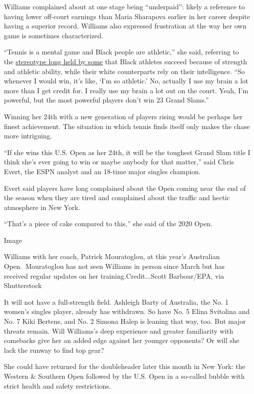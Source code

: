 Williams complained about at one stage being ``underpaid'': likely a
reference to having lower off-court earnings than Maria Sharapova
earlier in her career despite having a superior record. Williams also
expressed frustration at the way her own game is sometimes
characterized.

``Tennis is a mental game and Black people are athletic,'' she said,
referring to the
\href{https://www.nytimes.com/2020/06/30/sports/soccer/soccer-racism-broadcasting.html}{stereotype
long held by some} that Black athletes succeed because of strength and
athletic ability, while their white counterparts rely on their
intelligence. ``So whenever I would win, it's like, `I'm so athletic.'
No, actually I use my brain a lot more than I get credit for. I really
use my brain a lot out on the court. Yeah, I'm powerful, but the most
powerful players don't win 23 Grand Slams.''

Winning her 24th with a new generation of players rising would be
perhaps her finest achievement. The situation in which tennis finds
itself only makes the chase more intriguing.

``If she wins this U.S. Open as her 24th, it will be the toughest Grand
Slam title I think she's ever going to win or maybe anybody for that
matter,'' said Chris Evert, the ESPN analyst and an 18-time major
singles champion.

Evert said players have long complained about the Open coming near the
end of the season when they are tired and complained about the traffic
and hectic atmosphere in New York.

``That's a piece of cake compared to this,'' she said of the 2020 Open.

Image

Williams with her coach, Patrick Mouratoglou, at this year's Australian
Open.~Mouratoglou has not seen Williams in person since March but has
received regular updates on her training.Credit...Scott Barbour/EPA, via
Shutterstock

It will not have a full-strength field. Ashleigh Barty of Australia, the
No. 1 women's singles player, already has withdrawn. So have No. 5 Elina
Svitolina and No. 7 Kiki Bertens, and No. 2 Simona Halep is leaning that
way, too. But major threats remain. Will Williams's deep experience and
greater familiarity with comebacks give her an added edge against her
younger opponents? Or will she lack the runway to find top gear?

She could have returned for the doubleheader later this month in New
York: the Western \& Southern Open followed by the U.S. Open in a
so-called bubble with strict health and safety restrictions.


